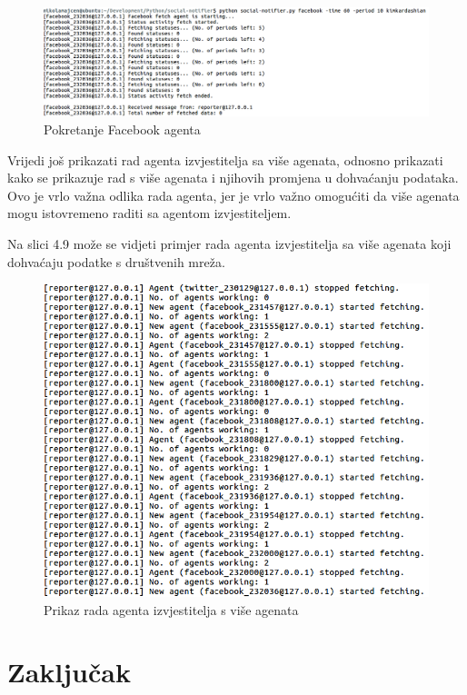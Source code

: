\documentclass[a4paper,12pt]{foi}
\begin{document}
\begin{figure}[h]
\includegraphics[width=\linewidth, frame]{08-facebook-fetch}
	\caption{Pokretanje Facebook agenta}
\end{figure}

Vrijedi još prikazati rad agenta izvjestitelja sa više agenata, odnosno prikazati kako se prikazuje rad s više agenata i njihovih promjena u dohvaćanju podataka. Ovo je vrlo važna odlika rada agenta, jer je vrlo važno omogućiti da više agenata mogu istovremeno raditi sa agentom izvjestiteljem. 

Na slici 4.9 može se vidjeti primjer rada agenta izvjestitelja sa više agenata koji dohvaćaju podatke s društvenih mreža.

\begin{figure}[h]
\includegraphics[width=\linewidth, frame]{09-reporter-multiconnect}
	\caption{Prikaz rada agenta izvjestitelja s više agenata}
\end{figure}


\chapter{Zaključak}



\end{document}
